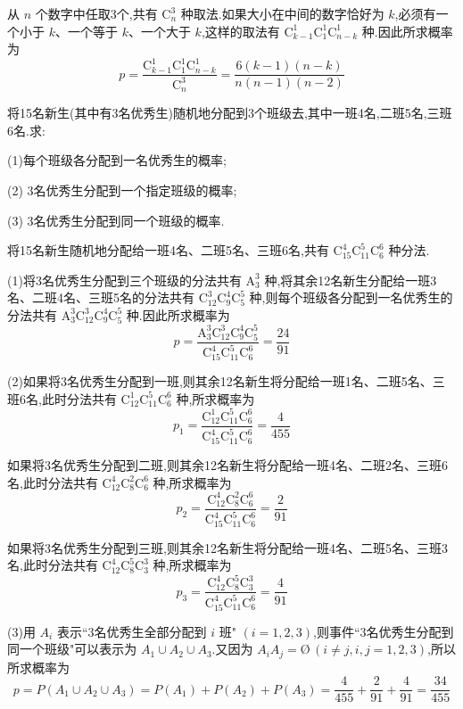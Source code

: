 \begin{solution}
    从 $n$ 个数字中任取3个,共有 $\mathrm{C}_{n}^3$ 种取法.如果大小在中间的数字恰好为 $k$,必须有一个小于 $k$、一个等于 $k$、一个大于 $k$,这样的取法有 $\mathrm{C}_{k-1}^1 \mathrm{C}_1^1 \mathrm{C}_{n-k}^1$ 种.因此所求概率为
    $$
    p = \dfrac{\mathrm{C}_{k-1}^1 \mathrm{C}_1^1 \mathrm{C}_{n-k}^1}{\mathrm{C}_{n}^3} = \dfrac{6(k-1)(n-k)}{n(n-1)(n-2)}
    $$
\end{solution}

\question 将15名新生(其中有3名优秀生)随机地分配到3个班级去,其中一班4名,二班5名,三班6名.求:

(1)每个班级各分配到一名优秀生的概率;

(2) 3名优秀生分配到一个指定班级的概率;

(3) 3名优秀生分配到同一个班级的概率.

\begin{solution}
    将15名新生随机地分配给一班4名、二班5名、三班6名,共有 $\mathrm{C}_{15}^4 \mathrm{C}_{11}^5 \mathrm{C}_6^6$ 种分法.

    (1)将3名优秀生分配到三个班级的分法共有 $\mathrm{A}_3^3$ 种,将其余12名新生分配给一班3名、二班4名、三班5名的分法共有 $\mathrm{C}_{12}^3 \mathrm{C}_9^4 \mathrm{C}_5^5$ 种,则每个班级各分配到一名优秀生的分法共有 $\mathrm{A}_3^3 \mathrm{C}_{12}^3 \mathrm{C}_9^4 \mathrm{C}_5^5$ 种.因此所求概率为
    $$
    p = \dfrac{\mathrm{A}_3^3 \mathrm{C}_{12}^3 \mathrm{C}_9^4 \mathrm{C}_5^5}{\mathrm{C}_{15}^4 \mathrm{C}_{11}^5 \mathrm{C}_6^6} = \dfrac{24}{91}
    $$

    (2)如果将3名优秀生分配到一班,则其余12名新生将分配给一班1名、二班5名、三班6名,此时分法共有 $\mathrm{C}_{12}^1 \mathrm{C}_{11}^5 \mathrm{C}_6^6$ 种,所求概率为
    $$
    p_1 = \dfrac{\mathrm{C}_{12}^1 \mathrm{C}_{11}^5 \mathrm{C}_6^6}{\mathrm{C}_{15}^4 \mathrm{C}_{11}^5 \mathrm{C}_6^6} = \dfrac{4}{455}
    $$

    如果将3名优秀生分配到二班,则其余12名新生将分配给一班4名、二班2名、三班6名,此时分法共有 $\mathrm{C}_{12}^4 \mathrm{C}_{8}^2 \mathrm{C}_6^6$ 种,所求概率为
    $$
    p_2 = \dfrac{\mathrm{C}_{12}^4 \mathrm{C}_{8}^2 \mathrm{C}_6^6}{\mathrm{C}_{15}^4 \mathrm{C}_{11}^5 \mathrm{C}_6^6} = \dfrac{2}{91}
    $$

    如果将3名优秀生分配到三班,则其余12名新生将分配给一班4名、二班5名、三班3名,此时分法共有 $\mathrm{C}_{12}^4 \mathrm{C}_{8}^5 \mathrm{C}_3^3$ 种,所求概率为
    $$
    p_3 = \dfrac{\mathrm{C}_{12}^4 \mathrm{C}_{8}^5 \mathrm{C}_3^3}{\mathrm{C}_{15}^4 \mathrm{C}_{11}^5 \mathrm{C}_6^6} = \dfrac{4}{91}
    $$

    (3)用 $A_i$ 表示``3名优秀生全部分配到 $i$ 班" $(i=1,2,3)$,则事件``3名优秀生分配到同一个班级"可以表示为 $A_1 \cup A_2 \cup A_3$.又因为 $A_i A_j = \text{\O} \, (i \not= j, i,j=1,2,3)$,所以所求概率为
    $$
    p = P(A_1 \cup A_2 \cup A_3) = P(A_1) + P(A_2) + P(A_3) = \dfrac{4}{455} + \dfrac{2}{91} + \dfrac{4}{91} = \dfrac{34}{455}
    $$
\end{solution}

